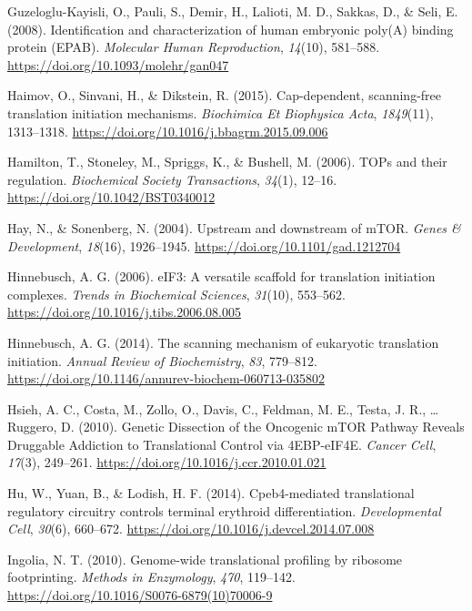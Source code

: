 \documentclass[12pt,openany]{book}
\begin{document}
\hypertarget{ref-Guzeloglu-Kayisli2008}{}
Guzeloglu-Kayisli, O., Pauli, S., Demir, H., Lalioti, M. D., Sakkas, D.,
\& Seli, E. (2008). Identification and characterization of human
embryonic poly(A) binding protein (EPAB). \emph{Molecular Human
Reproduction}, \emph{14}(10), 581--588.
\url{https://doi.org/10.1093/molehr/gan047}

\hypertarget{ref-Haimov2015}{}
Haimov, O., Sinvani, H., \& Dikstein, R. (2015). Cap-dependent,
scanning-free translation initiation mechanisms. \emph{Biochimica Et
Biophysica Acta}, \emph{1849}(11), 1313--1318.
\url{https://doi.org/10.1016/j.bbagrm.2015.09.006}

\hypertarget{ref-Hamilton2006}{}
Hamilton, T., Stoneley, M., Spriggs, K., \& Bushell, M. (2006). TOPs and
their regulation. \emph{Biochemical Society Transactions}, \emph{34}(1),
12--16. \url{https://doi.org/10.1042/BST0340012}

\hypertarget{ref-Hay2004}{}
Hay, N., \& Sonenberg, N. (2004). Upstream and downstream of mTOR.
\emph{Genes \& Development}, \emph{18}(16), 1926--1945.
\url{https://doi.org/10.1101/gad.1212704}

\hypertarget{ref-Hinnebusch2006}{}
Hinnebusch, A. G. (2006). eIF3: A versatile scaffold for translation
initiation complexes. \emph{Trends in Biochemical Sciences},
\emph{31}(10), 553--562.
\url{https://doi.org/10.1016/j.tibs.2006.08.005}

\hypertarget{ref-Hinnebusch2014}{}
Hinnebusch, A. G. (2014). The scanning mechanism of eukaryotic
translation initiation. \emph{Annual Review of Biochemistry}, \emph{83},
779--812. \url{https://doi.org/10.1146/annurev-biochem-060713-035802}

\hypertarget{ref-Hsieh2010}{}
Hsieh, A. C., Costa, M., Zollo, O., Davis, C., Feldman, M. E., Testa, J.
R., \ldots{} Ruggero, D. (2010). Genetic Dissection of the Oncogenic
mTOR Pathway Reveals Druggable Addiction to Translational Control via
4EBP-eIF4E. \emph{Cancer Cell}, \emph{17}(3), 249--261.
\url{https://doi.org/10.1016/j.ccr.2010.01.021}

\hypertarget{ref-Hu2014}{}
Hu, W., Yuan, B., \& Lodish, H. F. (2014). Cpeb4-mediated translational
regulatory circuitry controls terminal erythroid differentiation.
\emph{Developmental Cell}, \emph{30}(6), 660--672.
\url{https://doi.org/10.1016/j.devcel.2014.07.008}

\hypertarget{ref-Ingolia2010}{}
Ingolia, N. T. (2010). Genome-wide translational profiling by ribosome
footprinting. \emph{Methods in Enzymology}, \emph{470}, 119--142.
\url{https://doi.org/10.1016/S0076-6879(10)70006-9}
\end{document}
